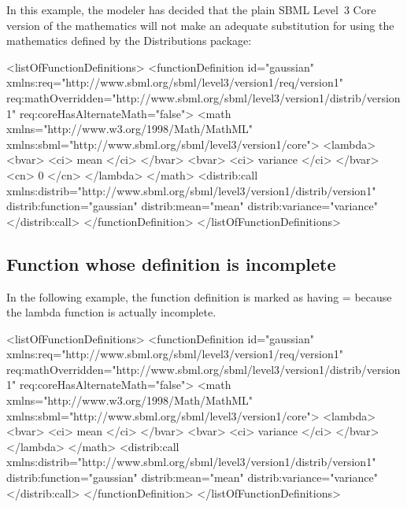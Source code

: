 In this example, the modeler has decided that the plain SBML Level~3 Core version of the mathematics will not make an adequate substitution for using the mathematics defined by the Distributions package:

\begin{example}
<listOfFunctionDefinitions> 
    <functionDefinition id="gaussian" 
                        xmlns:req="http://www.sbml.org/sbml/level3/version1/req/version1"
                        req:mathOverridden="http://www.sbml.org/sbml/level3/version1/distrib/version1" 
                        req:coreHasAlternateMath="false"> 
        <math xmlns="http://www.w3.org/1998/Math/MathML" 
              xmlns:sbml="http://www.sbml.org/sbml/level3/version1/core"> 
             <lambda>
                 <bvar> <ci> mean </ci> </bvar>
                 <bvar> <ci> variance </ci> </bvar>
                 <cn> 0 </cn>
             </lambda>
        </math> 
        <distrib:call xmlns:distrib="http://www.sbml.org/sbml/level3/version1/distrib/version1"    
                      distrib:function="gaussian" distrib:mean="mean" distrib:variance="variance"
        </distrib:call> 
    </functionDefinition> 
</listOfFunctionDefinitions> 
\end{example} 


\subsection{Function whose definition is incomplete}

In the following example, the function definition is marked as having = because the lambda function is actually incomplete.

\begin{example}
<listOfFunctionDefinitions> 
    <functionDefinition id="gaussian" 
                        xmlns:req="http://www.sbml.org/sbml/level3/version1/req/version1"
                        req:mathOverridden="http://www.sbml.org/sbml/level3/version1/distrib/version1" 
                        req:coreHasAlternateMath="false"> 
        <math xmlns="http://www.w3.org/1998/Math/MathML" 
              xmlns:sbml="http://www.sbml.org/sbml/level3/version1/core"> 
             <lambda>
                 <bvar> <ci> mean </ci> </bvar>
                 <bvar> <ci> variance </ci> </bvar>
             </lambda>
        </math> 
        <distrib:call xmlns:distrib="http://www.sbml.org/sbml/level3/version1/distrib/version1"    
                      distrib:function="gaussian" distrib:mean="mean" distrib:variance="variance"
        </distrib:call> 
    </functionDefinition> 
</listOfFunctionDefinitions> 
\end{example}
